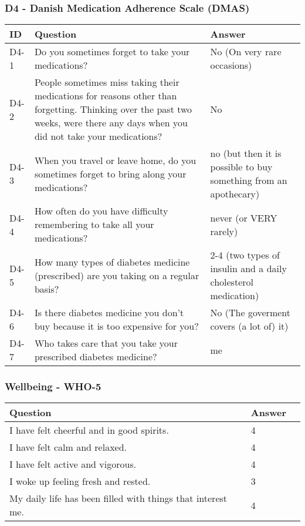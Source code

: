 \subsubsection{D4 - Danish Medication Adherence Scale (DMAS)}
\begin{table}[H]
    \centering
    \renewcommand{\arraystretch}{1.2}
    \begin{tabularx}{\textwidth}{|l|X|l|}
        \hline
        \textbf{ID} & \textbf{Question} & \textbf{Answer} \\ \hline
        D4-1 & Do you sometimes forget to take your medications? & 
        No (On very rare occasions)  
        \\ \hline
        D4-2 & People sometimes miss taking their medications for reasons other than forgetting. Thinking over the past two weeks, were there any days when you did not take your medications? & 
        No  
        \\ \hline
        D4-3 & When you travel or leave home, do you sometimes forget to bring along your medications? & 
        no (but then it is possible to buy something from an apothecary)  
        \\ \hline
        D4-4 & How often do you have difficulty remembering to take all your medications? & 
        never (or VERY rarely) 
        \\ \hline
        D4-5 & How many types of diabetes medicine (prescribed) are you taking on a regular basis? & 
        2-4 (two types of insulin and a daily cholesterol medication) 
        \\ \hline
        D4-6 & Is there diabetes medicine you don't buy because it is too expensive for you? & 
        No (The goverment covers (a lot of) it) 
        \\ \hline
        D4-7 & Who takes care that you take your prescribed diabetes medicine? &  
        me 
        \\ \hline
    \end{tabularx}
\end{table}

\subsubsection{Wellbeing - WHO-5}\label{sec:who-5-answers}
\begin{table}[H]
    \centering
    \renewcommand{\arraystretch}{1.2}
    \begin{tabularx}{\textwidth}{|l|X|l|}
        \hline
        \textbf{Question} & \textbf{Answer} \\ \hline
        I have felt cheerful and in good spirits. & 
        4 
        \\ \hline
        I have felt calm and relaxed. & 
        4 
        \\ \hline
        I have felt active and vigorous. & 
        4 
        \\ \hline
        I woke up feeling fresh and rested. & 
        3 
        \\ \hline
        My daily life has been filled with things that interest me. & 
        4
        \\ \hline
    \end{tabularx}
\end{table}

